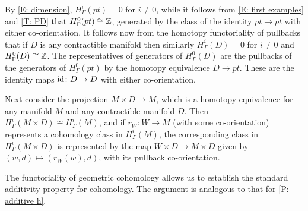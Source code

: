 \begin{example}\label{E: contractible}
By \cref{E: dimension}, $H^i_\Gamma(pt)=0$ for $i\neq 0$, while it follows from \cref{E: first examples} and \cref{T: PD} that  $H^0_\Gamma(pt) \cong \mathbb{Z}$, generated by the class of the identity $pt \to pt$ with either co-orientation.
It follows now from the homotopy functoriality of pullbacks that if $D$ is any contractible manifold then similarly $H^i_\Gamma(D)=0$ for $i\neq 0$ and $H^0_\Gamma(D) \cong \mathbb{Z}$.
The representatives of generators of $H^0_\Gamma(D)$ are the pullbacks of the generators of $H^0_\Gamma(pt)$ by the homotopy equivalence $D \to pt$.
These are the identity maps $\mathrm{id} \colon D \to D$ with either co-orientation.

Next consider the projection $M \times D \to M$, which is a homotopy equivalence for any manifold $M$ and any contractible manifold $D$.
Then $H^i_\Gamma(M \times D) \cong H^i_\Gamma(M)$, and if $r_W \colon W \to M$ (with some co-orientation) represents a cohomology class in $H^i_\Gamma(M)$, the corresponding class in $H^i_\Gamma(M \times D)$ is represented by the map $W \times D \to M \times D$ given by $(w,d) \mapsto (r_W(w),d)$, with its pullback co-orientation.
\end{example}

The functoriality of geometric cohomology allows us to establish the standard additivity property for cohomology.
The argument is analogous to that for \cref{P: additive h}.

